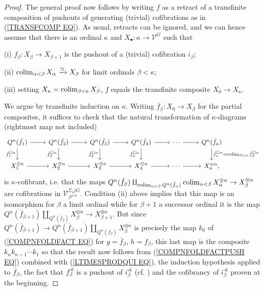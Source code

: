 \documentclass[a4paper,10pt]{article}%
\begin{document}
\begin{proof}
  The general proof now follows by writing $f$ as a retract of a transfinite composition of pushouts of generating (trivial) cofibrations as in (\ref{TRANSFCOMP EQ}).
  As usual, retracts can be ignored, and we can hence assume that there is an ordinal $\kappa$
  and $X_{\bullet} \colon \kappa \to \mathcal{V}^G$
  such that 
  \begin{inparaenum}
  \item[(i)] 
    $f_{\beta} \colon X_{\beta} \to X_{\beta+1}$
    is the pushout of a (trivial) cofibration $i_{\beta}$;
  \item[(ii)] 
    $\operatorname{colim}_{\alpha < \beta} X_{\alpha} \xrightarrow{\simeq} X_{\beta}$ for limit ordinals $\beta < \kappa$;
  \item[(iii)] setting 
    $X_{\kappa} = \operatorname{colim}_{\beta < \kappa} X_{\beta}$, 
    $f$ equals the transfinite composite $X_0 \to X_{\kappa}$.
  \end{inparaenum}


  We argue by transfinite induction on $\kappa$.
  Writing $\bar{f}_{\beta} \colon X_0 \to X_{\beta}$ for the partial composites, it suffices to check that the natural transformation of $\kappa$-diagrams (rightmost map not included)
  \[
  \begin{tikzcd}
    Q^n(\bar{f}_{1}) \ar{d}[swap]{\bar{f}_1^{\square n}} \ar{r}
    &
    Q^n(\bar{f}_{2}) \ar{d}[swap]{\bar{f}_2^{\square n}} \ar{r}
    &
    Q^n(\bar{f}_{3}) \ar{d}[swap]{\bar{f}_3^{\square n}} \ar{r}
    &
    Q^n(\bar{f}_{4}) \ar{d}[swap]{\bar{f}_4^{\square n}} \ar{r}
    &
    \cdots \ar{r}
    &
    Q^n(\bar{f}_{\kappa}) \ar{d}{\bar{f}_{\kappa}^{\square n}
      =\colim_{\beta < \kappa} \bar{f}_{\beta}^{\square n}}
    \\
    X_1^{\otimes n} \ar{r}
    &
    X_2^{\otimes n} \ar{r}
    &
    X_3^{\otimes n} \ar{r}
    &
    X_4^{\otimes n} \ar{r}
    &
    \cdots \ar{r}
    &
    X_{\kappa}^{\otimes n},
  \end{tikzcd}
  \]
  is $\kappa$-cofibrant, i.e. that the maps 
  $Q^n(\bar{f}_{\beta})
  \amalg_{\operatorname{colim}_{\alpha < \beta} Q^n(\bar{f}_{\alpha}) }
  \operatorname{colim}_{\alpha < \beta} X_{\alpha}^{\otimes n} 
  \to
  X_{\beta}^{\otimes n} 
  $ are cofibrations in 
  $\mathcal{V}^{\Sigma_n \wr G}_{\mathcal{F}^{\ltimes n}}$.
  Condition (ii) above implies that this map is an isomorphism for $\beta$ a limit ordinal 
  while for $\beta+1$ a successor ordinal it is the map
  $Q^n(\bar{f}_{\beta+1})
  \amalg_{Q^n(\bar{f}_{\beta}) }
  X_{\beta}^{\otimes n} 
  \to
  X_{\beta+1}^{\otimes n}$.
  But since 
  $Q^n(\bar{f}_{\beta+1}) \to Q^n(\bar{f}_{\beta+1})
  \amalg_{Q^n(\bar{f}_{\beta}) }
  X_{\beta}^{\otimes n}$ 
  is precisely the map $k_0$ of (\ref{COMPNFOLDFACT EQ}) for 
  $g=\bar{f}_{\beta}$, $h=f_{\beta}$, this last map is the composite $k_nk_{n-1}\cdots k_1$ so that the result now follows from (\ref{COMPNFOLDFACTPUSH EQ}) combined with 
  (\ref{LTIMESPRODQUI EQ}), the induction hypothesis applied to $\bar{f}_{\beta}$, the fact that $f_{\beta}^{\square k}$ is a pushout of $i_{\beta}^{\square k}$
  (cf. \cite[Lemma 4.11]{Pe16}) and the cofibrancy of $i_{\beta}^{\square k}$ proven at the beginning.
\end{proof}
\end{document}

